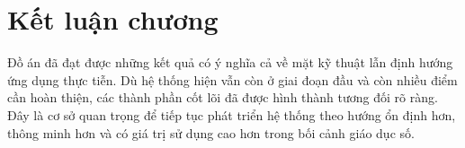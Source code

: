 \section{Kết luận chương}
Đồ án đã đạt được những kết quả có ý nghĩa cả về mặt kỹ thuật lẫn định hướng ứng dụng thực tiễn. Dù hệ thống hiện vẫn còn ở giai đoạn đầu và còn nhiều điểm cần hoàn thiện, các thành phần cốt lõi đã được hình thành tương đối rõ ràng. Đây là cơ sở quan trọng để tiếp tục phát triển hệ thống theo hướng ổn định hơn, thông minh hơn và có giá trị sử dụng cao hơn trong bối cảnh giáo dục số.